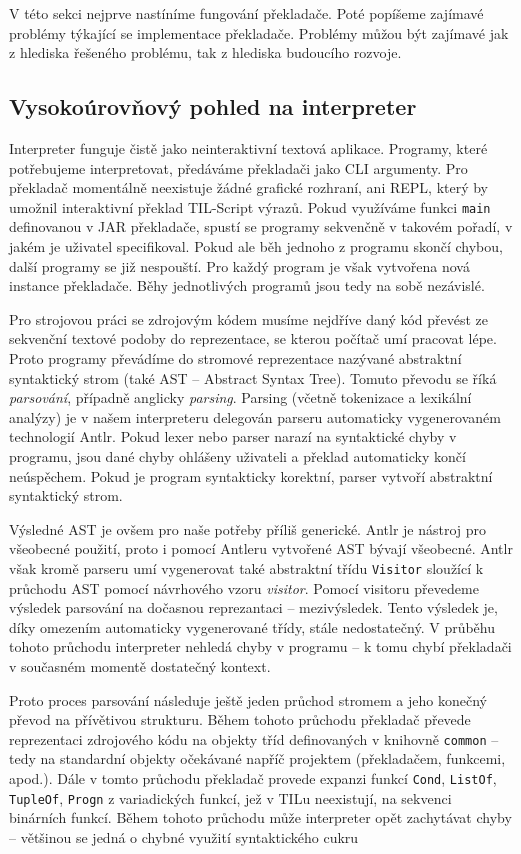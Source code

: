V této sekci nejprve nastíníme fungování překladače. Poté popíšeme zajímavé problémy týkající se
implementace překladače. Problémy můžou být zajímavé jak z hlediska řešeného problému, tak
z hlediska budoucího rozvoje.

\subsection{Vysokoúrovňový pohled na interpreter}

Interpreter funguje čistě jako neinteraktivní textová aplikace. Programy, které potřebujeme
interpretovat, předáváme překladači jako CLI argumenty. Pro překladač momentálně neexistuje žádné
grafické rozhraní, ani REPL, který by umožnil interaktivní překlad TIL-Script výrazů. Pokud
využíváme funkci \lstinline{main} definovanou v JAR překladače, spustí se programy sekvenčně
v takovém pořadí, v jakém je uživatel specifikoval. Pokud ale běh jednoho z programu skončí chybou,
další programy se již nespouští. Pro každý program je však vytvořena nová instance překladače. Běhy
jednotlivých programů jsou tedy na sobě nezávislé.

Pro strojovou práci se zdrojovým kódem musíme nejdříve daný kód převést ze sekvenční textové podoby
do reprezentace, se kterou počítač umí pracovat lépe. Proto programy převádíme do stromové
reprezentace nazývané abstraktní syntaktický strom (také AST -- Abstract Syntax Tree). Tomuto převodu
se říká \textit{parsování}, případně anglicky \textit{parsing}. Parsing (včetně tokenizace a
lexikální analýzy) je v našem interpreteru delegován parseru automaticky vygenerovaném technologií
Antlr. Pokud lexer nebo parser narazí na syntaktické chyby v programu, jsou dané chyby ohlášeny
uživateli a překlad automaticky končí neúspěchem. Pokud je program syntakticky korektní,
parser vytvoří abstraktní syntaktický strom.

Výsledné AST je ovšem pro naše potřeby příliš generické. Antlr je nástroj pro všeobecné použití,
proto i pomocí Antleru vytvořené AST bývají všeobecné. Antlr však kromě parseru umí vygenerovat také
abstraktní třídu \lstinline{Visitor} sloužící k průchodu AST pomocí návrhového vzoru
\textit{visitor}. Pomocí visitoru převedeme výsledek parsování na dočasnou reprezantaci --
mezivýsledek. Tento výsledek je, díky omezením automaticky vygenerované třídy, stále nedostatečný.
V průběhu tohoto průchodu interpreter nehledá chyby v programu -- k tomu chybí překladači v současném
momentě dostatečný kontext.

Proto proces parsování následuje ještě jeden průchod stromem a jeho konečný převod na přívětivou
strukturu. Během tohoto průchodu překladač převede reprezentaci zdrojového kódu na objekty tříd
definovaných v knihovně \lstinline{common} -- tedy na standardní objekty očekávané napříč projektem
(překladačem, funkcemi, apod.). Dále v tomto průchodu překladač provede expanzi funkcí
\lstinline{Cond}, \lstinline{ListOf}, \lstinline{TupleOf}, \lstinline{Progn} z variadických funkcí,
jež v TILu neexistují, na sekvenci binárních funkcí. Během tohoto průchodu může interpreter opět
zachytávat chyby -- většinou se jedná o chybné využití syntaktického cukru

